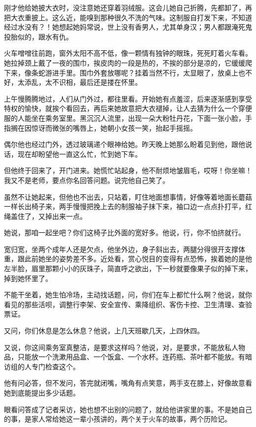 \documentclass[lang=cn,newtx,12pt,scheme=chinese]{elegantbook}
\begin{document}
刚才他给她披大衣时，没注意她还穿着羽绒服。这会儿她自己折腾，先都卸了，再把大衣重披上。这么近，能嗅到那种很久不洗的气味。这制服自打发下来，不知道经过水没有？！她想起她妈常说，世上没有香男人，尤其单身汉；男人都跟淹死鬼投胎似的，跟水有仇。

火车噌噌往前跑，窗外太阳不高不低，像一颗情有独钟的眼珠，死死盯着火车看。她拉掉颈上戴了一夜的围巾，挨皮肉的一段是热的，不挨的部分是凉的，它缓缓爬下来，像条蛇游进手里。围巾外套放哪呢？挂着当然不行，太显眼了，放桌上也不好，太添乱，太不识相，最后还是搂在怀里。

上午慢腾腾地过，人们从门外过，都往里看。开始她有点羞涩，后来逐渐感到享受特权的愉快，就挨个看回去，再后来她故意把大衣褪掉，让人去猜为什么一个穿便服的人能坐在乘务室里。黑沉沉人流里，出现一朵大粉牡丹花，下面一张小脸，手指搁在因惊讶而微张的嘴唇上，她朝小女孩一笑，抬起手摇摇。

偶尔他也经过门外，透过玻璃递个眼神给她。昨天晚上她那么盼着见到他，跟他说话，现在却盼望他一直这么忙，忙到她下车。

但他终于回来了，开门进来。她慌忙站起身，他不耐烦地皱眉毛，哎呀！你坐嘛！我又不是老师，要点你名回答问题。说完他自己笑了。

虽然不让她起来，但他也不出去，只站着，盯住地面想事情，好像等着地面长蘑菇一样长出椅子来，两手慢慢把挽上去的制服袖子抹下来，袖口边一点点扑打平，红绳盖住了，又掉出来一点。

她说，那咱一起坐吧？你们这椅子比外面的宽好多。他说，行，你不怕挤就行。

宽归宽，坐两个成年人还是欠点，他坐外边，身子斜出去，两腿分得很开支撑体重，跟此前她坐的姿势差不多。近处看，赏心悦目的变得有点恐怖，挨着她的是他左半脸，眉里那颗小小的灰珠子，简直呼之欲出，下一秒就要像果子似的掉下来，掉到她怀里了。

不能干坐着，她生怕冷场，主动找话题，问，你们在车上都忙什么啊？他说，就你看见的那些活呗，调整行李架、安全宣传、乘降组织、客伤卡控、卫生清理、查验票证。

又问，你们休息是怎么休息？他说，上几天班歇几天，上四休四。

又说，你这间乘务室真整洁，是要求这样吗？他说，对，是要求，不能放私人物品，只能放一个洗漱用品盒、一个饭盒、一个水杯。连药瓶、茶叶都不能放。有暗访组的人专门检查这个。

他有问必答，但不发问，答完就闭嘴，嘴角有点笑意，两手支在膝上，好像故意看她到底能提出多少话题。

眼看问答成了记者采访，她也想不出别的问题了，就给他讲家里的事。不是她自己的事，是家人常给她这一辈小孩讲的，两个关于火车的故事，两个历险记。
\end{document}
